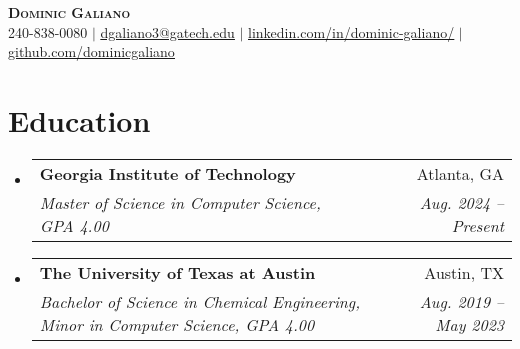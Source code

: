 \documentclass[letterpaper,11pt]{article}
\makeatletter
\newcommand{\resumeSubheading}[4]{
  \vspace{-2pt}\item
    \begin{tabular*}{0.97\textwidth}[t]{l@{\extracolsep{\fill}}r}
      \textbf{#1} & #2 \\
      \textit{\small#3} & \textit{\small #4} \\
    \end{tabular*}\vspace{-7pt}
}
\newcommand{\resumeSubHeadingListStart}{\begin{itemize}[leftmargin=0.15in, label={}]}
\newcommand{\resumeSubHeadingListEnd}{\end{itemize}}
\makeatother
\begin{document}

\begin{center}
    \textbf{\Huge \scshape Dominic Galiano} \\ \vspace{1pt}
    \small 240-838-0080 $|$ \href{mailto:dgaliano3@gatech.edu}{\underline{dgaliano3@gatech.edu}} $|$ 
    \href{https://linkedin.com/in/dominic-galiano/}{\underline{linkedin.com/in/dominic-galiano/}} $|$
    \href{https://github.com/dominicgaliano}{\underline{github.com/dominicgaliano}}
\end{center}


\section{Education}
  \resumeSubHeadingListStart
    \resumeSubheading
      {Georgia Institute of Technology}{Atlanta, GA}
      {Master of Science in Computer Science, \textnormal{GPA 4.00}}{Aug. 2024 -- Present}
    \resumeSubheading
      {The University of Texas at Austin}{Austin, TX}
      {Bachelor of Science in Chemical Engineering, Minor in Computer Science, \textnormal{GPA 4.00}}{Aug. 2019 -- May 2023}
  \resumeSubHeadingListEnd


\end{document}
